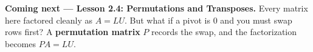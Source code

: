 \documentclass[10pt]{article}
\begin{document}
\begin{spiralbox}
\textbf{Coming next --- Lesson 2.4: Permutations and Transposes.} Every matrix here factored cleanly as
$A=LU$. But what if a pivot is $0$ and you must swap rows first? A \textbf{permutation matrix} $P$
records the swap, and the factorization becomes $PA=LU$.
\end{spiralbox}
\end{document}
